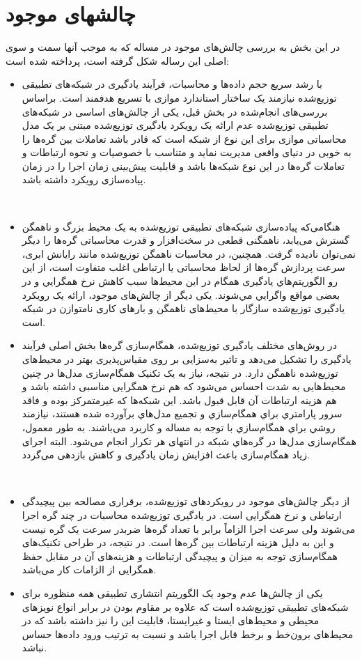 \section{چالشهای موجود}
در این بخش به بررسی چالش‌های موجود در مساله که به موجب آنها سمت و سوی اصلی این رساله شکل گرفته است، پرداخته شده است:
\begin{itemize}
	\item
	با رشد سریع حجم داده‌ها و محاسبات، فرآیند یادگیری در شبکه‌های تطبیقی توزیع‌شده نیازمند یک ساختار استاندارد موازی با تسریع هدفمند است. براساس بررسی‌های انجام‌شده در بخش قبل، یکی از چالش‌های اساسی در شبکه‌های تطبیقی توزیع‌شده عدم ارائه یک رویکرد یادگیری توزیع‌شده مبتنی بر یک مدل محاسباتی موازی برای این نوع از شبکه است که قادر باشد تعاملات بین گره‌ها را به خوبی در دنیای واقعی مدیریت نماید و متناسب با خصوصیات و نحوه ارتباطات و تعاملات گره‌ها در این نوع شبکه‌ها باشد و قابلیت پیش‌بینی زمان اجرا را در زمان پیاده‌سازی رویکرد داشته باشد.
	
	‌\item 
	هنگامی‌که پیاده‌سازی شبکه‌های تطبیقی توزیع‌شده به یک محیط بزرگ و ناهمگن گسترش می‌یابد، ناهمگنی قطعی در سخت‌افزار و قدرت محاسباتی گره‌ها را دیگر نمی‌توان نادیده گرفت. همچنین، در محاسبات ناهمگن توزيع‌شده مانند رایانش ابری، سرعت پردازش گره‌ها از لحاظ محاسباتی يا ارتباطی اغلب متفاوت است، از اين رو الگوريتم‌هاي یادگیری همگام در اين محيط‌ها سبب كاهش نرخ همگرايي و در بعضی مواقع واگرايي مي‌شوند. یکی دیگر از چالش‌های موجود، ارائه یک رویکرد یادگیری توزیع‌شده سازگار با محیط‌های ناهمگن و بارهای ‌کاری نامتوازن در شبکه است. 
	
	\item 
	در روش‌های مختلف یادگیری توزیع‌شده، همگام‌سازی گره‌ها بخش اصلی فرآیند یادگیری را تشکیل می‌دهد و تاثیر به‌سزایی بر روی مقیاس‌پذیری بهتر در محیط‌های توزیع‌شده ناهمگن دارد. در نتیجه، نیاز به یک تکنیک همگام‌سازی مدل‌ها در چنین محیط‌هایی به شدت احساس می‌شود که هم نرخ‌ همگرایی مناسبی داشته باشد و هم هزینه ارتباطات آن قابل قبول باشد. این شبکه‌ها که غيرمتمركز بوده و فاقد سرور پارامتري براي همگام‌سازي و تجميع مدل‌هاي برآورده شده هستند، نیازمند روشي براي همگام‌سازي با توجه به مساله و كاربرد می‌باشند. به طور معمول، همگام‌سازی مدل‌ها در گره‌هاي شبكه در انتهای هر تكرار انجام می‌شود. البته اجرای زياد همگام‌سازی باعث افزایش زمان یادگیری و کاهش بازدهی می‌گردد.

	‌\item 
	از دیگر چالش‌های موجود در رویکردهای توزیع‌شده، برقراری مصالحه بین پیچیدگی ارتباطی و نرخ همگرایی است. در یادگیری توزیع‌شده محاسبات در چند گره اجرا می‌شوند ولی سرعت اجرا الزاماً برابر با تعداد گره‌ها ضربدر سرعت یک گره نیست و این به دلیل هزینه ارتباطات بین گره‌ها است. در نتیجه، در طراحی تکنیک‌های همگام‌سازی توجه به میزان و پیچیدگی ارتباطات و هزینه‌های آن در مقابل حفظ همگرایی از الزامات کار می‌باشد.
	
		\item 
	‌یکی از چالش‌‌ها عدم وجود یک الگوریتم انتشاری تطبیقی همه منظوره برای شبکه‌های تطبیقی توزیع‌شده است که علاوه بر مقاوم بودن در برابر انواع نویزهای محیطی و محیط‌های ایستا و غیرایستا، قابلیت این را نیز داشته باشد که در محیط‌های برون‌خط و برخط قابل اجرا باشد و نسبت به ترتیب ورود داده‌ها حساس نباشد.
\end{itemize}
